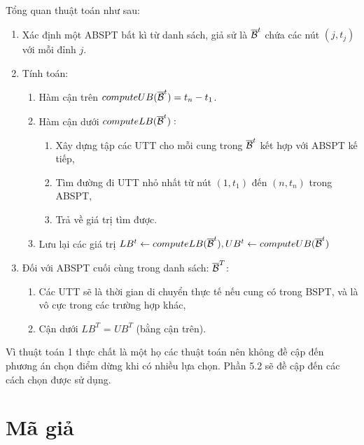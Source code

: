 \documentclass[14pt,oneside]{scrbook}
\providecommand{\tightlist}{\setlength{\itemsep}{\smallskipamount}\setlength{\parskip}{0pt}}
\begin{document}
Tổng quan thuật toán như sau:

\begin{enumerate}
\def\labelenumi{\arabic{enumi}.}
\tightlist
\item
  Xác định một ABSPT bất kì từ danh sách, giả sử là
  \(\overline {\cal B} ^{t}\) chứa các nút \((j, t_j)\) với mỗi đỉnh
  \(j\).
\item
  Tính toán:

  \begin{enumerate}
  \def\labelenumii{\arabic{enumii}.}
  \tightlist
  \item
    Hàm cận trên \(computeUB(\overline {\cal B} ^{t}) = t_n -t_1\).
  \item
    Hàm cận dưới \(computeLB(\overline {\cal B} ^{t}):\)

    \begin{enumerate}
    \def\labelenumiii{\arabic{enumiii}.}
    \tightlist
    \item
      Xây dựng tập các UTT cho mỗi cung trong
      \(\overline {\cal B} ^{t}\) kết hợp với ABSPT kế tiếp,
    \item
      Tìm đường đi UTT nhỏ nhất từ nút \((1, t_1)\) đến \((n, t_n)\)
      trong ABSPT,
    \item
      Trả về giá trị tìm được.
    \end{enumerate}
  \item
    Lưu lại các giá trị
    \(LB^t \gets computeLB(\overline {\cal B} ^{t}), UB^t \gets computeUB(\overline {\cal B} ^{t})\)
  \end{enumerate}
\item
  Đối với ABSPT cuối cùng trong danh sách: \(\overline {\cal B} ^{T}\):

  \begin{enumerate}
  \def\labelenumii{\arabic{enumii}.}
  \tightlist
  \item
    Các UTT sẽ là thời gian di chuyển thực tế nếu cung có trong BSPT, và
    là vô cực trong các trường hợp khác,
  \item
    Cận dưới \(LB^T\) = \(UB^T\) (bằng cận trên).
  \end{enumerate}
\end{enumerate}

Vì thuật toán 1 thực chất là một họ các thuật toán nên không đề cập đến
phương án chọn điểm dừng khi có nhiều lựa chọn. Phần 5.2 sẽ đề cập đến
các cách chọn được sử dụng.

\section{Mã giả}\label{muxe3-giux1ea3}
\end{document}
